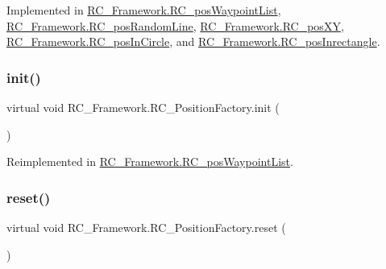 Implemented in \mbox{\hyperlink{class_r_c___framework_1_1_r_c__pos_waypoint_list_a2f91d419c6513795cae3464fda807450}{R\+C\+\_\+\+Framework.\+R\+C\+\_\+pos\+Waypoint\+List}}, \mbox{\hyperlink{class_r_c___framework_1_1_r_c__pos_random_line_ad5a37e0d9cc9baea5d0a3f8b6b80bd9e}{R\+C\+\_\+\+Framework.\+R\+C\+\_\+pos\+Random\+Line}}, \mbox{\hyperlink{class_r_c___framework_1_1_r_c__pos_x_y_a773d0a5b2b6bfc49510dbecdfbf1f9cc}{R\+C\+\_\+\+Framework.\+R\+C\+\_\+pos\+XY}}, \mbox{\hyperlink{class_r_c___framework_1_1_r_c__pos_in_circle_a4cec38bb6d1617a7ad918d59c5125df9}{R\+C\+\_\+\+Framework.\+R\+C\+\_\+pos\+In\+Circle}}, and \mbox{\hyperlink{class_r_c___framework_1_1_r_c__pos_inrectangle_aafd0da0c3d4742c9aade81342125af81}{R\+C\+\_\+\+Framework.\+R\+C\+\_\+pos\+Inrectangle}}.

\mbox{\label{class_r_c___framework_1_1_r_c___position_factory_af966db836e692a5a485531d227caa944}} 
\subsubsection{\texorpdfstring{init()}{init()}}
{\footnotesize\ttfamily virtual void R\+C\+\_\+\+Framework.\+R\+C\+\_\+\+Position\+Factory.\+init (\begin{DoxyParamCaption}{ }\end{DoxyParamCaption})\hspace{0.3cm}{\ttfamily [virtual]}}



Reimplemented in \mbox{\hyperlink{class_r_c___framework_1_1_r_c__pos_waypoint_list_a9bd29086f89fd9b6ad534dbf1d2785ab}{R\+C\+\_\+\+Framework.\+R\+C\+\_\+pos\+Waypoint\+List}}.

\mbox{\label{class_r_c___framework_1_1_r_c___position_factory_a582a8b01a360280d67b199b1190d96f7}} 
\subsubsection{\texorpdfstring{reset()}{reset()}}
{\footnotesize\ttfamily virtual void R\+C\+\_\+\+Framework.\+R\+C\+\_\+\+Position\+Factory.\+reset (\begin{DoxyParamCaption}{ }\end{DoxyParamCaption})\hspace{0.3cm}{\ttfamily [virtual]}}



